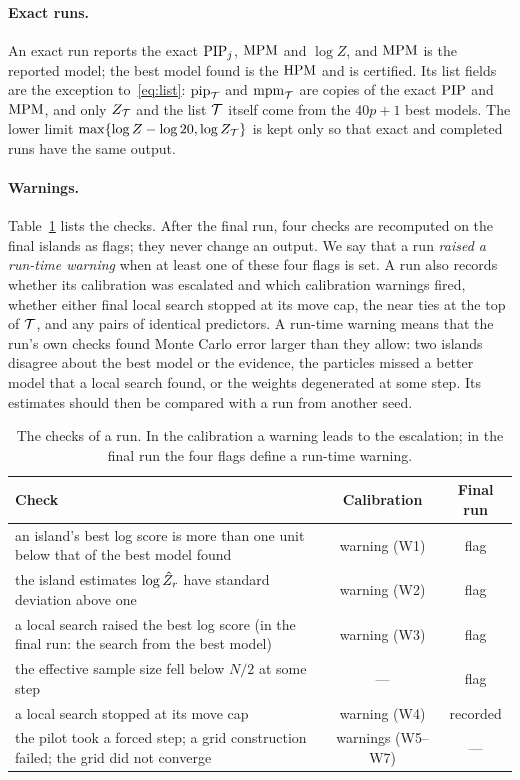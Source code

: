\paragraph{Exact runs.} An exact run reports the exact $\mathrm{PIP}_j$, $\mathrm{MPM}$ and $\log Z$, and $\mathrm{MPM}$ is the reported
model; the best model found is the $\mathrm{HPM}$ and is certified. Its list fields are the exception to~\eqref{eq:list}:
$\mathrm{pip}_{\mathcal T}$ and $\mathrm{mpm}_{\mathcal T}$ are copies of the exact $\mathrm{PIP}$ and $\mathrm{MPM}$, and only $Z_{\mathcal T}$ and the list $\mathcal T$ itself
come from the $40p+1$ best models.
The lower limit $\max\{\log Z-\log20,\log Z_{\mathcal T}\}$ is kept only so that exact and completed runs have the same
output.

\paragraph{Warnings.} Table~\ref{tab:warnings} lists the checks. After the final run, four checks are recomputed on
the final islands as flags; they never change an output. We say that a run \emph{raised a run-time warning} when at
least one of these four flags is set. A run also records whether its calibration was escalated and which calibration
warnings fired, whether either final local search stopped at its move cap, the near ties at the top of $\mathcal T$, and
any pairs of identical predictors. A run-time warning means that the run's own checks found Monte Carlo error larger
than they allow: two islands disagree about the best model or the evidence, the particles missed a better model that
a local search found, or the weights degenerated at some step. Its estimates should then be compared with a run from
another seed.

\begin{table}[tp]
\centering\small\renewcommand{\arraystretch}{1.15}
\caption{The checks of a run. In the calibration a warning leads to the escalation; in the final run the four flags
define a run-time warning.}\label{tab:warnings}
\begin{tabular}{@{}>{\raggedright\arraybackslash}p{9.2cm}cc@{}}
\toprule
Check & Calibration & Final run \\
\midrule
an island's best log score is more than one unit below that of the best model found & warning (W1) & flag \\
the island estimates $\log\hat Z_r$ have standard deviation above one & warning (W2) & flag \\
a local search raised the best log score (in the final run: the search from the best model) & warning (W3) & flag \\
the effective sample size fell below $N/2$ at some step & --- & flag \\
a local search stopped at its move cap & warning (W4) & recorded \\
the pilot took a forced step; a grid construction failed; the grid did not converge & warnings (W5--W7) & --- \\
\bottomrule
\end{tabular}
\end{table}

\FloatBarrier
